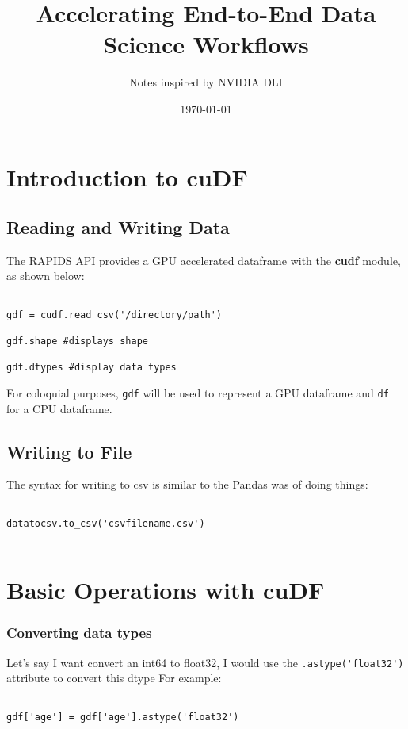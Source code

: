 \documentclass{article}
\title{Accelerating End-to-End Data Science Workflows}
\author{Notes inspired by NVIDIA DLI}
\date{\today}
\begin{document}
\maketitle

\section{Introduction to cuDF}
\subsection{Reading and Writing Data}
The RAPIDS API provides a GPU accelerated dataframe with the \textbf{cudf} module, as shown below:

\begin{verbatim}

gdf = cudf.read_csv('/directory/path')

gdf.shape #displays shape

gdf.dtypes #display data types

\end{verbatim}

For coloquial purposes, \verb_gdf_ will be used to represent a GPU dataframe and \verb_df_ for a CPU dataframe.

\subsection{Writing to File}

The syntax for writing to csv is similar to the Pandas was of doing things:

\begin{verbatim}

datatocsv.to_csv('csvfilename.csv')


\end{verbatim}
\section{Basic Operations with cuDF}
\subsubsection{Converting data types}
Let's say I want convert an int64 to float32, I would use the \verb_.astype('float32')_ attribute to convert this dtype
For example:


\begin{verbatim}

gdf['age'] = gdf['age'].astype('float32')

\end{verbatim}
\end{document}
